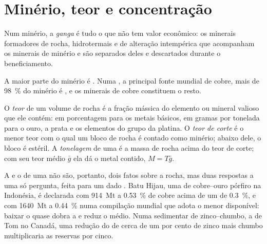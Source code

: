 \section{Minério, teor e concentração}\label{sec:b2:ore-deposits:grade}

\begin{definition}[Ganga]\label{def:b2:ore-deposits:ore}
Num minério, a \emph{ganga} é tudo o que não tem valor econômico: os
minerais formadores de rocha, hidrotermais e de alteração intempérica que acompanham os minerais de minério e são
separados deles e descartados durante o beneficiamento.
\end{definition}

A maior parte do minério é . Numa , a principal fonte mundial de cobre, mais de
\qty{98}{\percent} do minério é , e os minerais de cobre constituem o resto.

\begin{definition}\label{def:b2:ore-deposits:grade}
O \emph{teor} de um volume de rocha é a fração mássica do elemento ou mineral
valioso que ele contém: em porcentagem para os metais básicos, em gramas por tonelada para o ouro, a prata e os
elementos do grupo da platina. O \emph{teor de corte} é o menor teor com o
qual um bloco de rocha é contado como minério; abaixo dele, o bloco é estéril. A
\emph{tonelagem} de uma  é a massa de rocha acima do teor de corte; com seu
teor médio $\bar g$ ela dá o metal contido, $M = T\bar g$.
\end{definition}

A  e o  de uma  não são, portanto, dois fatos sobre a rocha, mas duas
respostas a uma só pergunta, feita para um dado . Batu Hijau, uma  de cobre--ouro pórfiro na
Indonésia, é declarada com \qty{914}{Mt} a \qty{0.53}{\percent} de cobre acima de um
 de \qty{0.3}{\percent}, e com \qty{1640}{Mt} a \qty{0.44}{\percent} numa compilação mundial
que adota o menor  disponível: baixar o  quase dobra a  e
reduz o  médio. Numa  sedimentar de zinco--chumbo, a  de Tom no Canadá, uma redução
do  de cerca de um por cento de zinco mais chumbo multiplicaria as reservas por cinco.

